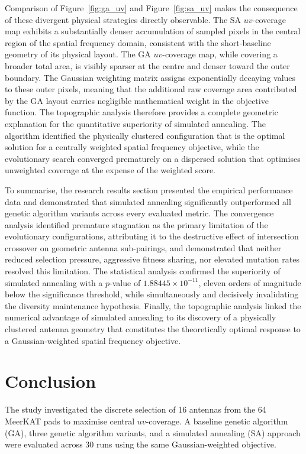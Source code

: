 \documentclass[conference]{IEEEtran}
\begin{document}
Comparison of Figure~\ref{fig:ga_uv} and Figure~\ref{fig:sa_uv} makes the consequence of
these divergent physical strategies directly observable. The SA $uv$-coverage map exhibits a
substantially denser accumulation of sampled pixels in the central region of the spatial
frequency domain, consistent with the short-baseline geometry of its physical layout. The GA
$uv$-coverage map, while covering a broader total area, is visibly sparser at the centre and
denser toward the outer boundary. The Gaussian weighting matrix assigns exponentially
decaying values to these outer pixels, meaning that the additional raw coverage area
contributed by the GA layout carries negligible mathematical weight in the objective function.
The topographic analysis therefore provides a complete geometric explanation for the
quantitative superiority of simulated annealing. The algorithm identified the physically
clustered configuration that is the optimal solution for a centrally weighted spatial frequency
objective, while the evolutionary search converged prematurely on a dispersed solution that
optimises unweighted coverage at the expense of the weighted score.

To summarise, the research results section presented the empirical performance data and
demonstrated that simulated annealing significantly outperformed all genetic algorithm
variants across every evaluated metric. The convergence analysis identified premature
stagnation as the primary limitation of the evolutionary configurations, attributing it to the
destructive effect of intersection crossover on geometric antenna sub-pairings, and
demonstrated that neither reduced selection pressure, aggressive fitness sharing, nor elevated
mutation rates resolved this limitation. The statistical analysis confirmed the superiority of
simulated annealing with a $p$-value of $1.88445 \times 10^{-11}$, eleven orders of magnitude
below the significance threshold, while simultaneously and decisively invalidating the
diversity maintenance hypothesis. Finally, the topographic analysis linked the numerical
advantage of simulated annealing to its discovery of a physically clustered antenna geometry
that constitutes the theoretically optimal response to a Gaussian-weighted spatial frequency
objective.

\section{Conclusion}

The study investigated the discrete selection of 16 antennas from the 64 MeerKAT pads to maximise 
central $uv$-coverage. A baseline genetic algorithm (GA), three genetic algorithm variants, and a simulated annealing (SA) approach 
were evaluated across 30 runs using the same Gaussian-weighted objective. 
\end{document}
